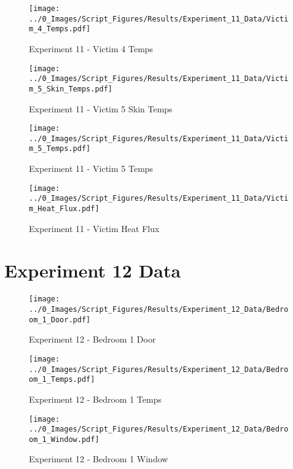 	\begin{figure}[H]
		\centering
		\texttt{[image: ../0\_Images/Script\_Figures/Results/Experiment\_11\_Data/Victim\_4\_Temps.pdf]}
		\caption[]{Experiment 11 - Victim 4 Temps}
	\end{figure}
 
	\clearpage

	\begin{figure}[H]
		\centering
		\texttt{[image: ../0\_Images/Script\_Figures/Results/Experiment\_11\_Data/Victim\_5\_Skin\_Temps.pdf]}
		\caption[]{Experiment 11 - Victim 5 Skin Temps}
	\end{figure}
 

	\begin{figure}[H]
		\centering
		\texttt{[image: ../0\_Images/Script\_Figures/Results/Experiment\_11\_Data/Victim\_5\_Temps.pdf]}
		\caption[]{Experiment 11 - Victim 5 Temps}
	\end{figure}
 
	\clearpage

	\begin{figure}[H]
		\centering
		\texttt{[image: ../0\_Images/Script\_Figures/Results/Experiment\_11\_Data/Victim\_Heat\_Flux.pdf]}
		\caption[]{Experiment 11 - Victim Heat Flux}
	\end{figure}
 

\clearpage		\large
\section{Experiment 12 Data} \label{App:Exp12Results} 

	\begin{figure}[H]
		\centering
		\texttt{[image: ../0\_Images/Script\_Figures/Results/Experiment\_12\_Data/Bedroom\_1\_Door.pdf]}
		\caption[]{Experiment 12 - Bedroom 1 Door}
	\end{figure}
 

	\begin{figure}[H]
		\centering
		\texttt{[image: ../0\_Images/Script\_Figures/Results/Experiment\_12\_Data/Bedroom\_1\_Temps.pdf]}
		\caption[]{Experiment 12 - Bedroom 1 Temps}
	\end{figure}
 
	\clearpage

	\begin{figure}[H]
		\centering
		\texttt{[image: ../0\_Images/Script\_Figures/Results/Experiment\_12\_Data/Bedroom\_1\_Window.pdf]}
		\caption[]{Experiment 12 - Bedroom 1 Window}
	\end{figure}
 

